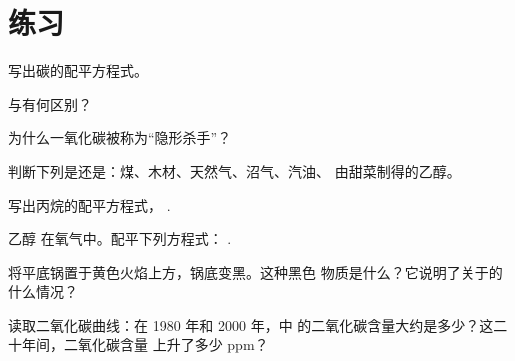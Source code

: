 \section{练习}

\begin{exercise}[$\star$]\label{exo:g8:combustion-and-fuels:1}
写出碳的配平方程式。
\end{exercise}

\begin{exercise}[$\star$]\label{exo:g8:combustion-and-fuels:2}
与有何区别？
\end{exercise}

\begin{exercise}[$\star$]\label{exo:g8:combustion-and-fuels:3}
为什么一氧化碳被称为“隐形杀手”？
\end{exercise}

\begin{exercise}[$\star$]\label{exo:g8:combustion-and-fuels:4}
判断下列是还是：煤、木材、天然气、沼气、汽油、
由甜菜制得的乙醇。
\end{exercise}

\begin{exercise}[$\star\star$]\label{exo:g8:combustion-and-fuels:5}
写出丙烷的配平方程式，
.
\end{exercise}

\begin{exercise}[$\star\star$]\label{exo:g8:combustion-and-fuels:6}
乙醇  在氧气中。配平下列方程式：
. %
\end{exercise}

\begin{exercise}[$\star\star$]\label{exo:g8:combustion-and-fuels:7}
将平底锅置于黄色火焰上方，锅底变黑。这种黑色
物质是什么？它说明了关于的什么情况？
\end{exercise}

\begin{exercise}[$\star\star$]\label{exo:g8:combustion-and-fuels:8}
读取二氧化碳曲线：在 1980 年和 2000 年，中
的二氧化碳含量大约是多少？这二十年间，二氧化碳含量
上升了多少 ppm？
\end{exercise}

